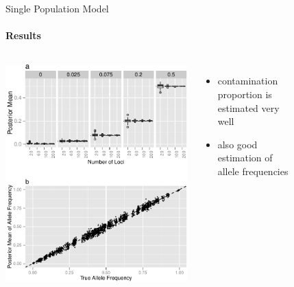 \documentclass[letter,graphicx]{beamer}
\begin{document}
\begin{frame}{Single Population Model}
\framesubtitle{Results}
\begin{columns}[b]

\column{2in}
\includegraphics[width=1\textwidth]{images/rho_and_allele.pdf}

\column{2.25in}
\begin{itemize}
\item contamination proportion is estimated very well
\vspace{3mm}
\item also good estimation of allele frequencies
\end{itemize}

\begin{table}
\hrule \hrule
\begin{center}
\begin{scriptsize}

\end{scriptsize}
\end{center}
\hrule
\end{table}

\end{columns}
\end{frame} 
\end{document}
